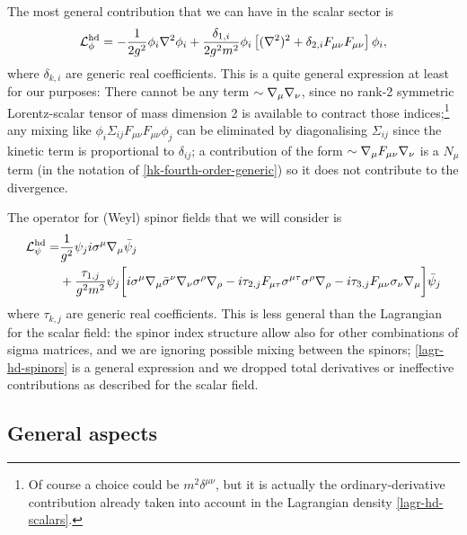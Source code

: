 The most general contribution that we can have in the scalar sector is
\begin{equation}\label{lagr-hd-scalars}
{ \mathcal{L} }^{ \text{hd} }_\phi = 
- \frac{1}{2 g^2} \phi_i { \mathcal{\nabla} }^2 \phi_i  
+ \frac{\delta_{1,i}}{2 g^2	m^2}  \phi_i \left[  ( { \mathcal{\nabla} }^2 )^2 
						+ \delta_{2,i} F_{\mu\nu} F_{\mu\nu}
						\right] \phi_i
			,
\end{equation} where $\delta_{k,i}$ are generic real coefficients.
This is a quite general expression at least for our purposes: There cannot be any term \( \sim { \mathcal{\nabla} }_\mu { \mathcal{\nabla} }_\nu \), since no rank-2 symmetric Lorentz-scalar tensor of mass dimension 2 is available to contract those indices;\footnote{Of course a choice could be $m^2 \delta^{\mu\nu}$, but it is actually the ordinary-derivative contribution already taken into account in the Lagrangian density \eqref{lagr-hd-scalars}.} any mixing like $ \phi_i \Sigma_{ij} F_{\mu\nu} F_{\mu\nu} \phi_j $ can be eliminated by diagonalising $\Sigma_{ij}$ since the kinetic term is proportional to $\delta_{ij}$; a contribution of the form $\sim { \mathcal{\nabla} }_\mu F_{\mu\nu} { \mathcal{\nabla} }_\nu $ is a $N_\mu$ term (in the notation of \eqref{hk-fourth-order-generic}) so it does not contribute to the divergence. 

The operator for (Weyl) spinor fields that we will consider is
\begin{equation}\label{lagr-hd-spinors}
\begin{split}
{ \mathcal{L} }^{ \text{hd} }_\psi =  
& \frac{1}{g^2}  \psi_j i \sigma^\mu { \mathcal{\nabla} }_\mu \bar \psi_j \\
& + \frac{\tau_{1,j}}{ g^2 m^2 }  \psi_j \bigg[ 
		i \sigma^\mu  { \mathcal{\nabla} }_\mu \bar\sigma^\nu{ \mathcal{\nabla} }_\nu \sigma^\rho { \mathcal{\nabla} }_\rho
		-i  \tau_{2,j} F_{ \mu \tau } \sigma^{\mu \tau}  \sigma^\rho { \mathcal{\nabla} }_\rho 
		-i \tau_{3,j} F_{ \mu \nu } \sigma_\nu { \mathcal{\nabla} }_\mu 
		\bigg]  \bar \psi_j
\end{split}
\end{equation}
where $\tau_{k,j}$ are generic real coefficients.
This is less general than the Lagrangian for the scalar field: the spinor index structure allow also for other combinations of sigma matrices, and we are ignoring possible mixing between the spinors;  \eqref{lagr-hd-spinors} is a general expression and we dropped total derivatives or ineffective contributions as described for the scalar field.




\subsection{General aspects}

